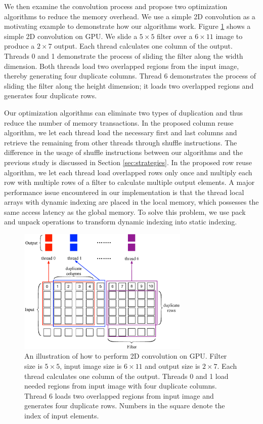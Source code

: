 We then examine the convolution process and propose two optimization algorithms to reduce the memory overhead. We use a simple 2D convolution as
a motivating example to demonstrate how our algorithms work. Figure \ref{fig:twostrategies} shows a simple 2D convolution on GPU. We
slide a $5 \times 5$ filter over a $6 \times 11$ image to produce a $2 \times 7$ output. Each thread calculates one column of the output.
Threads 0 and 1 demonstrate the process of sliding the filter along the width dimension. Both threads load
two overlapped regions from the input image, thereby generating four duplicate columns. Thread 6 demonstrates the process of sliding the
filter along the height dimension; it loads two overlapped regions and generates four duplicate rows.

Our optimization algorithms can eliminate two types of duplication and thus reduce the number of memory transactions. In the proposed column reuse algorithm, we let each thread load the necessary first and last columns and retrieve the remaining from other threads through shuffle
instructions. The difference in the usage of shuffle instructions between our algorithms and the previous study
\cite{vasilache2014fast} is discussed in Section \ref{sec:strategies}. In the proposed row reuse algorithm, we let each thread load overlapped
rows only once and multiply each row with multiple rows of a filter to calculate multiple output elements. A major performance issue
encountered in our implementation is that the thread local arrays with dynamic indexing are placed in the local memory, which possesses the same
access latency as the global memory. To solve this problem, we use pack and unpack operations to transform dynamic indexing into static indexing.

\begin{figure}
\centering
  \includegraphics[width=\columnwidth,height=6cm]{./figure/twostrategies.eps}
  \caption{An illustration of how to perform 2D convolution on GPU. Filter size is $5 \times 5$, input image size is $6 \times 11$ and output size is $2 \times 7$. Each thread calculates one column of the output. Threads 0 and 1 load needed regions from input image with four duplicate columns. Thread 6 loads two overlapped regions from input image and generates four duplicate rows. Numbers in the square denote the index of input elements.}
  \label{fig:twostrategies}
\end{figure}
